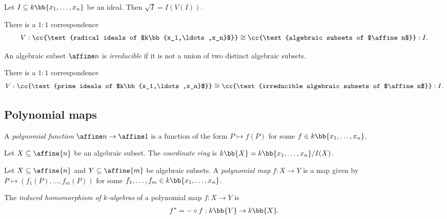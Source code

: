 \documentclass{article}
\begin{document}
\begin{theorem}[Nullstellensatz]
  Let $I\subseteq k\bb{x_1,\ldots,x_n}$ be an ideal. Then $\sqrt{I}=I(V(I))$.
\end{theorem}

\begin{corollary}
  There is a $1:1$ correspondence
  \begin{align*}
    V:\cc{\text{radical ideals of $k\bb{x_1,\ldots,x_n}$}}
    \cong \cc{\text{algebraic subsets of $\affine n$}}:I.
  \end{align*}
\end{corollary}

\begin{definition}
  An algebraic subset $\affine n$ is \emph{irreducible} if it is not a union of
  two distinct algebraic subsets.
\end{definition}

\begin{corollary}
  There is a $1:1$ correspondence
  \begin{align*}
    V:\cc{\text{prime ideals of $k\bb{x_1,\ldots,x_n}$}}
    \cong \cc{\text{irreducible algebraic subsets of $\affine n$}}:I.
  \end{align*}
\end{corollary}

\subsection{Polynomial maps}

\begin{definition}
  A \emph{polynomial function} $\affine n\to \affine 1$ is a function of the form
  $P\mapsto f(P)$ for some $f\in k\bb{x_1,\ldots,x_n}$.
\end{definition}

\begin{definition}
  Let $X\subseteq\affine{n}$ be an algebraic subset. The \emph{coordinate ring} is
  $k\bb{X}=k\bb{x_1,\ldots,x_n}/I(X)$.
\end{definition}

\begin{definition}
  Let $X\subseteq\affine{n}$ and $Y\subseteq\affine{m}$ be algebraic subsets. A
  \emph{polynomial map} $f:X\to Y$ is a map given by $P\mapsto (f_1(P),\ldots,f_m(P))$
  for some $f_1,\ldots,f_m\in k\bb{x_1,\ldots,x_n}$.

  The \emph{induced homomorphism of $k$-algebras} of a polynomial map $f:X\to Y$
  is
  \begin{align*}
    f^* = - \circ f : k\bb{Y}\to k\bb{X}.
  \end{align*}
\end{definition}
\end{document}
